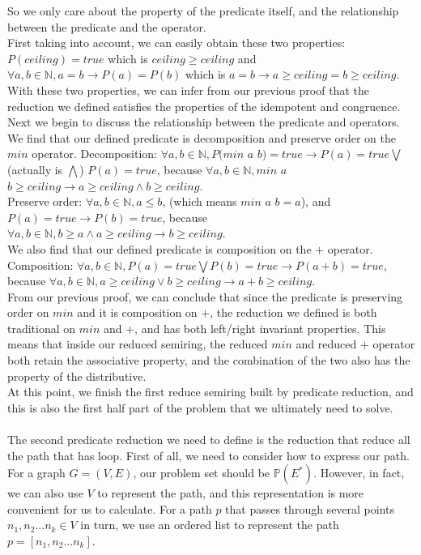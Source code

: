 \documentclass[a4paper,10pt]{article}
\begin{document}
So we only care about the property of the predicate itself, and the relationship between the predicate and the operator.\\
First taking into account, we can easily obtain these two properties: $P(ceiling) = true$ which is $ceiling \geq ceiling$ and $\forall a,b \in \mathbb{N}, a = b \rightarrow P(a) = P(b)$ which is $a = b \rightarrow a \geq ceiling = b \geq ceiling$. With these two properties, we can infer from our previous proof that the reduction we defined satisfies the properties of the idempotent and congruence.\\
Next we begin to discuss the relationship between the predicate and operators. \\
We find that our defined predicate is decomposition and preserve order on the $min$ operator.
Decomposition: $\forall a,b \in \mathbb{N}, P(min $ $a$ $b) = true \rightarrow P(a) = true \bigvee $(actually is $\bigwedge$) $P(a) = true$, because $\forall a,b \in \mathbb{N}, min $ $a$ $b \geq ceiling \rightarrow a \geq ceiling \wedge b \geq ceiling$.\\
Preserve order: $\forall a,b \in \mathbb{N}, a \leq b$, (which means $min $ $a$ $b = a$), and $P (a) = true \rightarrow P(b) = true$, because $\forall a,b \in \mathbb{N}, b \geq a \wedge a \geq ceiling \rightarrow b \geq ceiling$.\\
We also find that our defined predicate is composition on the $+$ operator.\\
Composition: $\forall a,b \in \mathbb{N}, P(a) = true \bigvee P(b) = true \rightarrow P(a + b) = true$, because $\forall a,b \in \mathbb{N}, a \geq ceiling \vee b \geq ceiling \rightarrow a + b \geq ceiling$.\\
From our previous proof, we can conclude that since the predicate is preserving order on $min$ and it is composition on $+$, the reduction we defined is both traditional on $min$ and $+$, and has both left/right invariant properties. 
This means that inside our reduced semiring, the reduced $min$ and reduced $+$ operator both retain the associative property, and the combination of the two also has the property of the distributive.\\
At this point, we finish the first reduce semiring built by predicate reduction, and this is also the first half part of the problem that we ultimately need to solve.\\\\
The second predicate reduction we need to define is the reduction that reduce all the path that has loop. First of all, we need to consider how to express our path. For a graph $G = (V,E)$, our problem set should be $\mathbb{P}(E^*)$. However, in fact, we can also use $V$ to represent the path, and this representation is more convenient for us to calculate. For a path $p$ that passes through several points $n_1,n_2 ... n_k \in V$ in turn, we use an ordered list to represent the path $p = [n_1,n_2 ... n_k]$. 
\end{document}
